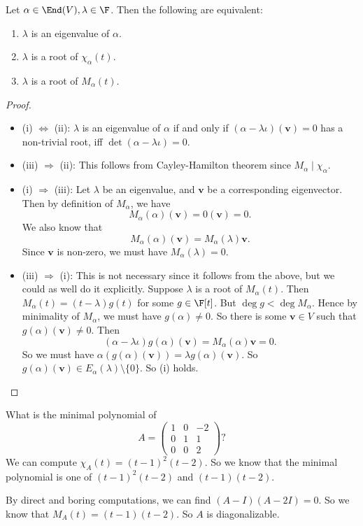 \documentclass[a4paper]{article}
\begin{document}
\begin{lemma}
  Let $\alpha \in \End(V), \lambda \in \F$. Then the following are equivalent:
  \begin{enumerate}
    \item $\lambda$ is an eigenvalue of $\alpha$.
    \item $\lambda$ is a root of $\chi_\alpha(t)$.
    \item $\lambda$ is a root of $M_\alpha(t)$.
  \end{enumerate}
\end{lemma}

\begin{proof}\leavevmode
  \begin{itemize}
    \item (i) $\Leftrightarrow$ (ii): $\lambda$ is an eigenvalue of $\alpha$ if and only if $(\alpha - \lambda \iota)(\mathbf{v}) = 0$ has a non-trivial root, iff $\det(\alpha - \lambda \iota) = 0$.
    \item (iii) $\Rightarrow$ (ii): This follows from Cayley-Hamilton theorem since $M_\alpha \mid \chi_\alpha$.
    \item (i) $\Rightarrow$ (iii): Let $\lambda$ be an eigenvalue, and $\mathbf{v}$ be a corresponding eigenvector. Then by definition of $M_\alpha$, we have
      \[
        M_\alpha(\alpha)(\mathbf{v}) = 0(\mathbf{v}) = 0.
      \]
      We also know that
      \[
        M_\alpha(\alpha)(\mathbf{v}) = M_\alpha(\lambda)\mathbf{v}.
      \]
      Since $\mathbf{v}$ is non-zero, we must have $M_\alpha(\lambda) =0$.

    \item (iii) $\Rightarrow$ (i): This is not necessary since it follows from the above, but we could as well do it explicitly. Suppose $\lambda$ is a root of $M_\alpha(t)$. Then $M_\alpha(t) = (t - \lambda) g(t)$ for some $g \in \F[t]$. But $\deg g < \deg M_\alpha$. Hence by minimality of $M_\alpha$, we must have $g(\alpha) \not= 0$. So there is some $\mathbf{v}\in V$ such that $g(\alpha)(\mathbf{v}) \not=0$. Then
      \[
        (\alpha - \lambda\iota)g(\alpha)(\mathbf{v}) = M_\alpha(\alpha)\mathbf{v} = 0.
      \]
      So we must have $\alpha (g(\alpha)(\mathbf{v})) = \lambda g(\alpha)(\mathbf{v})$. So $g(\alpha)(\mathbf{v}) \in E_\alpha(\lambda) \setminus \{0\}$. So (i) holds.\qedhere
  \end{itemize}
\end{proof}

\begin{eg}
  What is the minimal polynomial of
  \[
    A =
    \begin{pmatrix}
      1 & 0 & -2\\
      0 & 1 & 1\\
      0 & 0 & 2
    \end{pmatrix}?
  \]
  We can compute $\chi_A(t) = (t - 1)^2 (t - 2)$. So we know that the minimal polynomial is one of $(t - 1)^2(t - 2)$ and $(t - 1)(t - 2)$.

  By direct and boring computations, we can find $(A - I)(A - 2I) = 0$. So we know that $M_A(t) = (t - 1)(t - 2)$. So $A$ is diagonalizable.
\end{eg}
\end{document}

